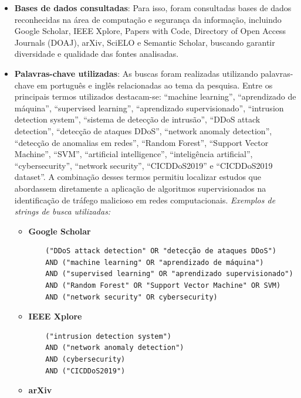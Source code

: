 \documentclass[
    12pt,                %
    openright,           %
    oneside,             %
    a4paper,             %
    english,             %
    brazil               %
]{abntex2}
\begin{document}
\begin{itemize}
    \item \textbf{Bases de dados consultadas}: Para isso, foram consultadas bases de dados reconhecidas na área de computação e segurança da informação, incluindo Google Scholar, IEEE Xplore, Papers with Code, Directory of Open Access Journals (DOAJ), arXiv, SciELO e Semantic Scholar, buscando garantir diversidade e qualidade das fontes analisadas.

    \item \textbf{Palavras-chave utilizadas}: As buscas foram realizadas utilizando palavras-chave em português e inglês relacionadas ao tema da pesquisa. Entre os principais termos utilizados destacam-se: “machine learning”, “aprendizado de máquina”, “supervised learning”, “aprendizado supervisionado”, “intrusion detection system”, “sistema de detecção de intrusão”, “DDoS attack detection”, “detecção de ataques DDoS”, “network anomaly detection”, “detecção de anomalias em redes”, “Random Forest”, “Support Vector Machine”, “SVM”, “artificial intelligence”, “inteligência artificial”, “cybersecurity”, “network security”, “CICDDoS2019” e “CICDDoS2019 dataset”. A combinação desses termos permitiu localizar estudos que abordassem diretamente a aplicação de algoritmos supervisionados na identificação de tráfego malicioso em redes computacionais.
    \textit{Exemplos de strings de busca utilizadas:}

    \begin{itemize}

        \item \textbf{Google Scholar}
        
    \begin{verbatim}
    ("DDoS attack detection" OR "detecção de ataques DDoS")
    AND ("machine learning" OR "aprendizado de máquina")
    AND ("supervised learning" OR "aprendizado supervisionado")
    AND ("Random Forest" OR "Support Vector Machine" OR SVM)
    AND ("network security" OR cybersecurity)
    \end{verbatim}

        \item \textbf{IEEE Xplore}

    \begin{verbatim}
    ("intrusion detection system")
    AND ("network anomaly detection")
    AND (cybersecurity)
    AND ("CICDDoS2019")
    \end{verbatim}

        \item \textbf{arXiv}


\end{itemize}
\end{itemize}
\end{document}
